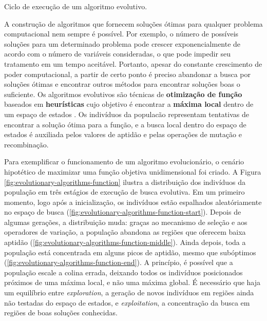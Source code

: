 \begin{algorithm}[h]
\begin{center}
	\begin{algorithmic}[1]
		\REPEAT
    \end{algorithmic}
\end{center}
\caption{Ciclo de execução de um algoritmo evolutivo.}
\label{alg:evolutionary-algorithm-skeleton}
\end{algorithm}

A construção de algoritmos que fornecem soluções ótimas para qualquer problema
computacional nem sempre é possível. Por exemplo, o número de possíveis soluções
para um determinado problema pode crescer exponencialmente de acordo com o
número de variáveis consideradas, o que pode impedir seu tratamento em um tempo
aceitável. Portanto, apesar do constante crescimento de poder computacional, a
partir de certo ponto é preciso abandonar a busca por soluções ótimas e
encontrar outros métodos para encontrar soluções boas o suficiente. Os
algoritmos evolutivos são técnicas de \textbf{otimização de função} baseados em
\textbf{heurísticas} cujo objetivo é encontrar a \textbf{máxima local} dentro de
um espaço de estados \cite[Cap. 3]{IntroEvolComputing}. Os indivíduos da
populacão representam tentativas de encontrar a solução ótima para a função, e a
busca local dentro do espaço de estados é auxiliada pelos valores de aptidão e
pelas operações de mutação e recombinação.

Para exemplificar o funcionamento de um algoritmo evolucionário, o cenário
hipotético de maximizar uma função objetiva unidimensional foi criado. A Figura
\ref{fig:evolutionary-algorithms-function} ilustra a distribuição dos indivíduos
da população em três estágios de execução de busca evolutiva. Em um primeiro
momento, logo após a inicialização, os indivíduos estão espalhados
aleatóriamente no espaço de busca
(\ref{fig:evolutionary-algorithms-function-start}). Depois de algumas gerações,
a distribuição muda: graças ao mecanismo de seleção e aos operadores de
variação, a população abandona as regiões que oferecem baixa aptidão
(\ref{fig:evolutionary-algorithms-function-middle}). Ainda depois, toda a
população está concentrada em alguns picos de aptidão, mesmo que subóptimos
(\ref{fig:evolutionary-algorithms-function-end}). A princípio, é possível que a
população escale a colina errada, deixando todos os indivíduos posicionados
próximos de uma máxima local, e não uma máxima global. É necessário que haja um
equilíbrio entre \textit{exploration}, a geração de novos indivíduos em regiões
ainda não testadas do espaço de estados, e \textit{exploitation}, a concentração
da busca em regiões de boas soluções conhecidas.

